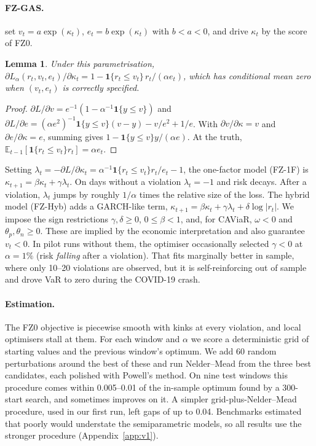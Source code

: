 \documentclass[11pt]{article}
\newtheorem{lemma}{Lemma}
\theoremstyle{remark}
\newcommand{\1}{\mathbf{1}}
\newcommand{\E}{\mathbb{E}}
\begin{document}
\paragraph{FZ-GAS.} \citet{patton2019dynamic} set $v_t=a\exp(\kappa_t)$, $e_t=b\exp(\kappa_t)$ with $b<a<0$, and drive $\kappa_t$ by the score of FZ0.
\begin{lemma}\label{lem:score}
Under this parametrisation, $\partial L_\alpha(r_t,v_t,e_t)/\partial\kappa_t=1-\1\{r_t\le v_t\}\,r_t/(\alpha e_t)$, which has conditional mean zero when $(v_t,e_t)$ is correctly specified.
\end{lemma}
\begin{proof}
$\partial L/\partial v=e^{-1}(1-\alpha^{-1}\1\{y\le v\})$ and $\partial L/\partial e=(\alpha e^2)^{-1}\1\{y\le v\}(v-y)-v/e^2+1/e$. With $\partial v/\partial\kappa=v$ and $\partial e/\partial\kappa=e$, summing gives $1-\1\{y\le v\}y/(\alpha e)$. At the truth, $\E_{t-1}[\1\{r_t\le v_t\}r_t]=\alpha e_t$.
\end{proof}
Setting $\lambda_t=-\partial L/\partial\kappa_t=\alpha^{-1}\1\{r_t\le v_t\}r_t/e_t-1$, the one-factor model (FZ-1F) is $\kappa_{t+1}=\beta\kappa_t+\gamma\lambda_t$. On days without a violation $\lambda_t=-1$ and risk decays. After a violation, $\lambda_t$ jumps by roughly $1/\alpha$ times the relative size of the loss. The hybrid model (FZ-Hyb) adds a GARCH-like term, $\kappa_{t+1}=\beta\kappa_t+\gamma\lambda_t+\delta\log|r_t|$. We impose the sign restrictions $\gamma,\delta\ge0$, $0\le\beta<1$, and, for CAViaR, $\omega<0$ and $\theta_p,\theta_n\ge0$. These are implied by the economic interpretation and also guarantee $v_t<0$. In pilot runs without them, the optimiser occasionally selected $\gamma<0$ at $\alpha=1\%$ (risk \emph{falling} after a violation). That fits marginally better in sample, where only 10--20 violations are observed, but it is self-reinforcing out of sample and drove VaR to zero during the COVID-19 crash.

\paragraph{Estimation.} The FZ0 objective is piecewise smooth with kinks at every violation, and local optimisers stall at them. For each window and $\alpha$ we score a deterministic grid of starting values and the previous window's optimum. We add 60 random perturbations around the best of these and run Nelder--Mead from the three best candidates, each polished with Powell's method. On nine test windows this procedure comes within 0.005--0.01 of the in-sample optimum found by a 300-start search, and sometimes improves on it. A simpler grid-plus-Nelder--Mead procedure, used in our first run, left gaps of up to 0.04. Benchmarks estimated that poorly would understate the semiparametric models, so all results use the stronger procedure (Appendix~\ref{app:v1}).
\end{document}
